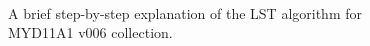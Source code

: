 \documentclass[hess, twostagejnl]{copernicus}
\begin{document}
\begin{figure}
	 \\
	\caption{A brief step-by-step explanation of the LST algorithm for MYD11A1 v006 collection.} 
	\label{fig:example_figure_c}
\end{figure}
\end{document}
